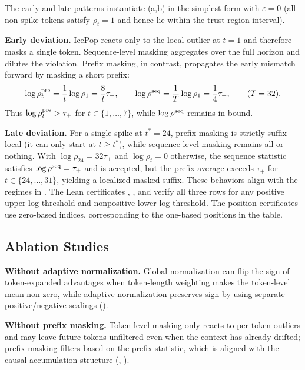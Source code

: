 \noindent The early and late patterns instantiate (a,b) in the simplest form with $\varepsilon=0$ (all non-spike
tokens satisfy $\rho_t=1$ and hence lie within the trust-region interval).
\par
\noindent\textbf{Early deviation.} IcePop reacts only to the local outlier at $t=1$ and therefore masks a single token. Sequence-level
masking aggregates over the full horizon and dilutes the violation. Prefix masking, in contrast, propagates the early mismatch forward by
masking a short prefix:
\[
    \log\rho_{t}^{\mathrm{pre}} = \frac{1}{t}\log\rho_1 = \frac{8}{t}\tau_+,
    \qquad
    \log\rho^{\mathrm{seq}} = \frac{1}{T}\log\rho_1 = \frac{1}{4}\tau_+,
    \qquad (T=32).
\]
Thus $\log\rho_{t}^{\mathrm{pre}}>\tau_+$ for $t\in\{1,\ldots,7\}$, while $\log\rho^{\mathrm{seq}}$ remains in-bound.
\par
\noindent\textbf{Late deviation.} For a single spike at $t^*=24$, prefix masking is strictly suffix-local (it can only start at $t\ge t^*$),
while sequence-level masking remains all-or-nothing. With $\log\rho_{24}=32\tau_+$ and $\log\rho_t=0$ otherwise, the sequence statistic
satisfies $\log\rho^{\mathrm{seq}}=\tau_+$ and is accepted, but the prefix average exceeds $\tau_+$ for $t\in\{24,\ldots,31\}$, yielding a localized
masked suffix. These behaviors align with the regimes in . The Lean certificates , , and  verify all three rows for any positive upper log-threshold and nonpositive lower log-threshold. The position certificates use zero-based indices, corresponding to the one-based positions in the table.

\subsection{Ablation Studies}

\textbf{Without adaptive normalization.} Global normalization can flip the sign of token-expanded advantages when token-length weighting makes the token-level mean non-zero, while adaptive normalization preserves sign by using separate positive/negative scalings ().

\textbf{Without prefix masking.} Token-level masking only reacts to per-token outliers and may leave future tokens unfiltered even when the context has already drifted; prefix masking filters based on the prefix statistic, which is aligned with the causal accumulation structure (, ).

